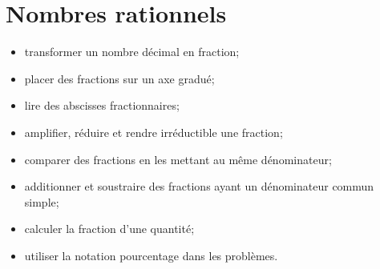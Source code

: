 \chapter{Nombres rationnels}\label{ChNombresRationnels}

\vspace{5cm}
\begin{acquis}
\begin{itemize}
\item transformer un nombre décimal en fraction;
\item placer des fractions sur un axe gradué;
\item lire des abscisses fractionnaires;
\item amplifier, réduire et rendre irréductible une fraction;
\item comparer des fractions en les mettant au même dénominateur;
\item additionner et soustraire des fractions ayant un dénominateur commun simple;
\item calculer la fraction d'une quantité;
\item utiliser la notation pourcentage dans les problèmes.
\end{itemize}
\end{acquis}


\activites




\exercicesbase
\begin{colonne*exercice}

\end{colonne*exercice}


\exercicesappr
\begin{colonne*exercice}

\end{colonne*exercice}

\connaissances


\TravauxPratiques %


\pagebreak

%


